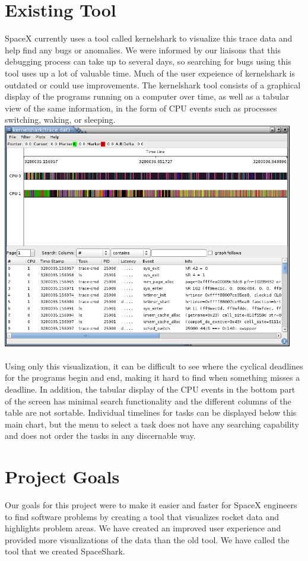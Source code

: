 \documentclass{hmcclinic}
\begin{document}
\section{Existing Tool}
SpaceX currently uses a tool called kernelshark to visualize this trace data and help find any bugs or anomalies. We were informed by our liaisons that this debugging process can take up to several days, so searching for bugs using this tool uses up a lot of valuable time. Much of the user expeience of kernelshark is outdated or could use improvements. The kernelshark tool consists of a graphical display of the programs running on a computer over time, as well as a tabular view of the same information, in the form of CPU events such as processes switching, waking, or sleeping.
\includegraphics[width=5in]{kshark-open.png}\\
\\
Using only this visualization, it can be difficult to see where the cyclical
deadlines for the programs begin and end, making it hard to find when something
misses a deadline. In addition, the tabular display of the CPU events in the
bottom part of the screen has minimal search functionality and the different
columns of the table are not sortable. Individual timelines for tasks can be
displayed below this main chart, but the menu to select a task does not have
any searching capability and does not order the tasks in any discernable way.

\section{Project Goals} %
Our goals for this project were to make it easier and faster for SpaceX engineers to find software problems by creating a tool that visualizes rocket data and highlights problem areas. We have created an improved user experience and provided more visualizations of the data than the old tool. We have called the tool that we created SpaceShark.
\end{document}

